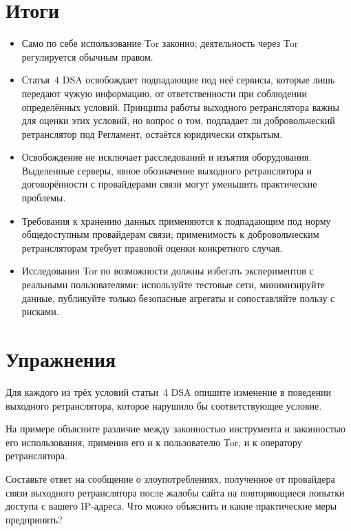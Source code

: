 \section*{Итоги}
\begin{itemize}
  \item Само по себе использование Tor законно; деятельность через Tor регулируется обычным правом.
  \item Статья~4 DSA освобождает подпадающие под неё сервисы, которые лишь передают чужую информацию, от ответственности при соблюдении определённых условий. Принципы работы выходного ретранслятора важны для оценки этих условий, но вопрос о том, подпадает ли добровольческий ретранслятор под Регламент, остаётся юридически открытым.
  \item Освобождение не исключает расследований и изъятия оборудования. Выделенные серверы, явное обозначение выходного ретранслятора и договорённости с провайдерами связи могут уменьшить практические проблемы.
  \item Требования к хранению данных применяются к подпадающим под норму общедоступным провайдерам связи; применимость к добровольческим ретрансляторам требует правовой оценки конкретного случая.
  \item Исследования Tor по возможности должны избегать экспериментов с реальными пользователями: используйте тестовые сети, минимизируйте данные, публикуйте только безопасные агрегаты и сопоставляйте пользу с рисками.
\end{itemize}

\section*{Упражнения}

\begin{esercizio}[1]\label{es:25-condizioni}
Для каждого из трёх условий статьи~4 DSA опишите изменение в поведении выходного ретранслятора, которое нарушило бы соответствующее условие.
\end{esercizio}

\begin{esercizio}[1]\label{es:25-strumento}
На примере объясните различие между законностью инструмента и законностью его использования, применив его и к пользователю Tor, и к оператору ретранслятора.
\end{esercizio}

\begin{esercizio}[2]\label{es:25-segnalazione}
Составьте ответ на сообщение о злоупотреблениях, полученное от провайдера связи выходного ретранслятора после жалобы сайта на повторяющиеся попытки доступа с вашего IP-адреса. Что можно объяснить и какие практические меры предпринять?
\end{esercizio}

